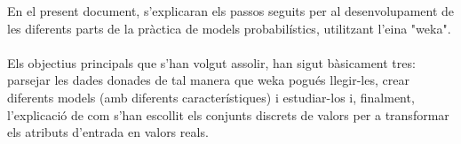 
En el present document, s'explicaran els passos seguits per al desenvolupament de les diferents parts de la pràctica de models probabilístics, utilitzant l'eina "weka".\\\\
Els objectius principals que s'han volgut assolir, han sigut bàsicament tres: parsejar les dades donades de tal manera que weka pogués llegir-les, crear diferents models (amb diferents característiques) i estudiar-los i, finalment, l'explicació de com s'han escollit els conjunts discrets de valors per a transformar els atributs d'entrada en valors reals. 
